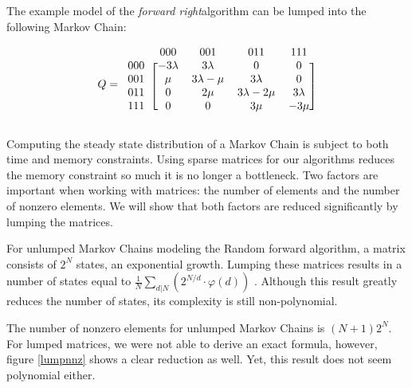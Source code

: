 \documentclass[10pt,a4paper]{article}
\newcommand{\FR}{\textit{forward right\xspace}}
\begin{document}
The example model of the \FR algorithm can be lumped into the following Markov Chain:

\[ Q =
  \begin{blockarray}{ccccc}
    & 000 & 001 & 011 & 111 \\
    \begin{block}{c[cccc]}
    000 & -3\lambda & 3\lambda & 0 & 0 \\
    001 & \mu & 3\lambda-\mu & 3\lambda & 0 \\
    011 & 0 & 2\mu & 3\lambda-2\mu & 3\lambda \\
    111 & 0 & 0 & 3\mu & -3\mu \\
    \end{block}
  \end{blockarray}
\]

Computing the steady state distribution of a Markov Chain is subject to both time and memory constraints. Using sparse matrices for our algorithms reduces the memory constraint so much it is no longer a bottleneck.
Two factors are important when working with matrices: the number of elements and the number of nonzero elements. We will show that both factors are reduced significantly by lumping the matrices.

For unlumped Markov Chains modeling the Random forward algorithm, a matrix consists of $2^N$ states, an exponential growth. Lumping these matrices results in a number of states equal to  $\frac{1}{N} \sum_{d|N} (2^{N/d} \cdot \varphi(d) )$ \cite{A000031}. Although this result greatly reduces the number of states, its complexity is still non-polynomial.

The number of nonzero elements for unlumped Markov Chains is $(N+1) 2^N$. For lumped matrices, we were not able to derive an exact formula, however, figure \ref{lumpnnz} shows a clear reduction as well. Yet, this result does not seem polynomial either.
\end{document}
